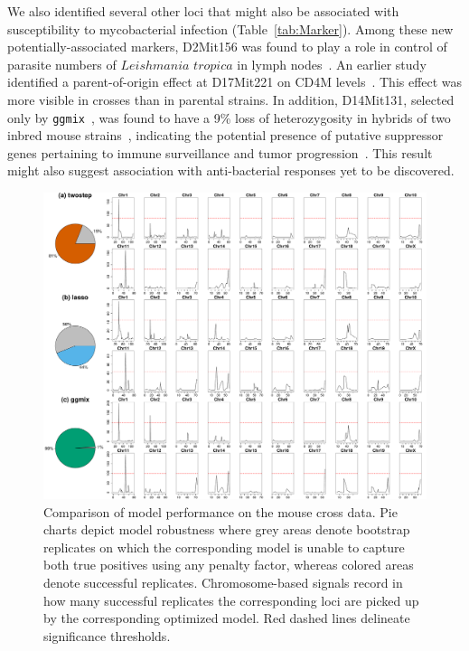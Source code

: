 \documentclass[12pt,letter]{article}\usepackage[]{graphicx}\usepackage[]{color}
\newenvironment{knitrout}{}{} %
\newcommand{\ggmix}{\texttt{ggmix}}
\begin{document}
We also identified several other loci that might also be associated with susceptibility to mycobacterial infection (Table~\ref{tab:Marker}). Among these new potentially-associated markers, D2Mit156 was found to play a role in control of parasite numbers of $Leishmania$ $tropica$ in lymph nodes~\citep{sohrabi2013mapping}. An earlier study identified a parent-of-origin effect at D17Mit221 on CD4M levels~\citep{jackson1999multiple}. This effect was more visible in crosses than in parental strains. In addition, D14Mit131, selected only by \ggmix ~, was found to have a 9\% loss of heterozygosity in hybrids of two inbred mouse strains~\citep{c2000allelotype}, indicating the potential presence of putative suppressor genes pertaining to immune surveillance and tumor progression~\citep{lasko1991loss}. This result might also suggest association with anti-bacterial responses yet to be discovered. 


\begin{knitrout}\scriptsize
{}\color{fgcolor}\begin{figure}[H]

{\centering \includegraphics[width=1\linewidth]{figure/Mice-comparison-fixTPR-1} 

}

\caption[Comparison of model performance on the mouse cross data]{Comparison of model performance on the mouse cross data. Pie charts depict model robustness where grey areas denote bootstrap replicates on which the corresponding model is unable to capture both true positives using any penalty factor, whereas colored areas denote successful replicates. Chromosome-based signals record in how many successful replicates the corresponding loci are picked up by the corresponding optimized model. Red dashed lines delineate significance thresholds.}\label{fig:Mice-comparison-fixTPR}
\end{figure}


\end{knitrout}
\end{document}
